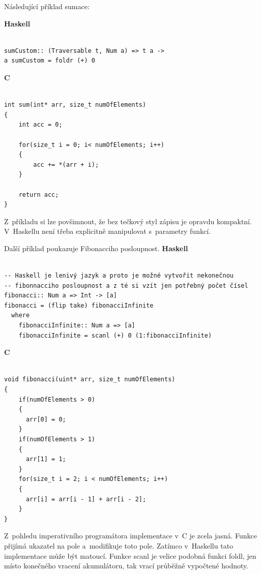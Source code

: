 \documentclass[male, czech]{kithesis}
\begin{document}
Následující příklad sumace:

\textbf{Haskell}
\begin{verbatim}

sumCustom:: (Traversable t, Num a) => t a ->
a sumCustom = foldr (+) 0

\end{verbatim}

\textbf{C}
\begin{verbatim}

int sum(int* arr, size_t numOfElements)
{
    int acc = 0;
    
    for(size_t i = 0; i< numOfElements; i++)
    {
        acc += *(arr + i);
    }
    
    return acc;
}

\end{verbatim}
Z~příkladu si lze povšimnout, 
že bez tečkový styl zápisu je opravdu kompaktní. 
V~Haskellu není třeba explicitně manipulovat s~parametry funkcí.

Další příklad poukazuje Fibonacciho posloupnost.
\textbf{Haskell}
\begin{verbatim}

-- Haskell je lenivý jazyk a proto je možné vytvořit nekonečnou 
-- fibonnacciho posloupnost a z té si vzít jen potřebný počet čísel 
fibonacci:: Num a => Int -> [a]
fibonacci = (flip take) fibonacciInfinite
  where
    fibonacciInfinite:: Num a => [a]
    fibonacciInfinite = scanl (+) 0 (1:fibonacciInfinite)

\end{verbatim}


\textbf{C}
\begin{verbatim}

void fibonacci(uint* arr, size_t numOfElements)
{
    if(numOfElements > 0)
    {
      arr[0] = 0;
    }
    if(numOfElements > 1)
    {
      arr[1] = 1;
    }
    for(size_t i = 2; i < numOfElements; i++)
    {
      arr[i] = arr[i - 1] + arr[i - 2];
    }
}

\end{verbatim}

Z~pohledu imperativního programátora implementace v~C je zcela jasná. 
Funkce přijímá ukazatel na pole a~modifikuje toto pole. 
Zatímco v~Haskellu tato implementace může být matoucí. 
Funkce scanl je velice podobná funkci foldl, 
jen místo konečného vracení akumulátoru, 
tak vrací průběžně vypočtené hodnoty.
\end{document}
